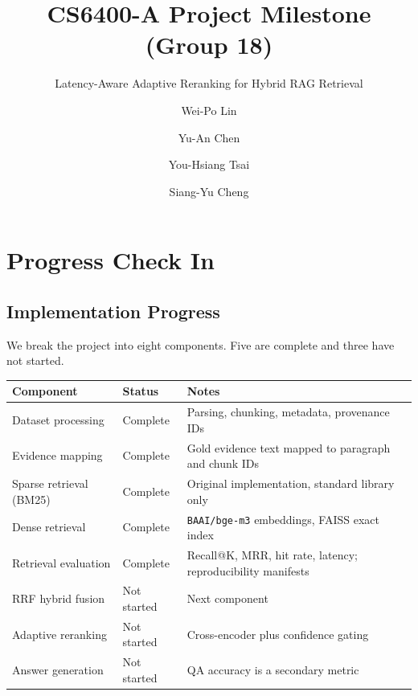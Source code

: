 \documentclass[sigconf,nonacm]{acmart}
\begin{document}
\title{CS6400-A Project Milestone (Group 18)}
\subtitle{Latency-Aware Adaptive Reranking for Hybrid RAG Retrieval}

\author{Wei-Po Lin}

\author{Yu-An Chen}

\author{You-Hsiang Tsai}

\author{Siang-Yu Cheng}

\maketitle

\section{Progress Check In}

\subsection{Implementation Progress}

We break the project into eight components. Five are complete and three have
not started.

\begin{table}[h]
\centering
\small
\begin{tabular}{@{}L{2.5cm}L{1.5cm}L{3.4cm}@{}}
\toprule
\textbf{Component} & \textbf{Status} & \textbf{Notes} \\
\midrule
Dataset processing      & Complete    & Parsing, chunking, metadata, provenance IDs \\
Evidence mapping        & Complete    & Gold evidence text mapped to paragraph and chunk IDs \\
Sparse retrieval (BM25) & Complete    & Original implementation, standard library only \\
Dense retrieval         & Complete    & \texttt{BAAI/bge-m3} embeddings, FAISS exact index \\
Retrieval evaluation    & Complete    & Recall@K, MRR, hit rate, latency; reproducibility manifests \\
RRF hybrid fusion       & Not started & Next component \\
Adaptive reranking      & Not started & Cross-encoder plus confidence gating \\
Answer generation       & Not started & QA accuracy is a secondary metric \\
\bottomrule
\end{tabular}
\end{table}
\end{document}
